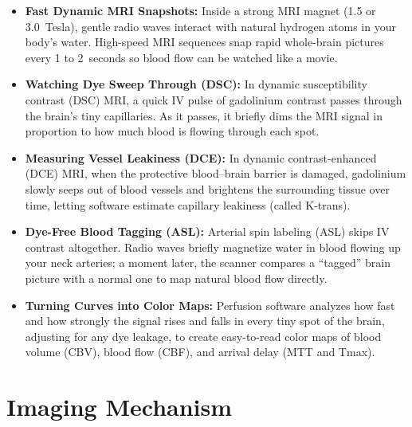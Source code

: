 \begin{itemize}
    \item \textbf{Fast Dynamic MRI Snapshots:} Inside a strong MRI magnet (1.5 or 3.0~Tesla), gentle radio waves interact with natural hydrogen atoms in your body's water. High-speed MRI sequences snap rapid whole-brain pictures every 1 to 2~seconds so blood flow can be watched like a movie.
    \item \textbf{Watching Dye Sweep Through (DSC):} In dynamic susceptibility contrast (DSC) MRI, a quick IV pulse of gadolinium contrast passes through the brain's tiny capillaries. As it passes, it briefly dims the MRI signal in proportion to how much blood is flowing through each spot.
    \item \textbf{Measuring Vessel Leakiness (DCE):} In dynamic contrast-enhanced (DCE) MRI, when the protective blood--brain barrier is damaged, gadolinium slowly seeps out of blood vessels and brightens the surrounding tissue over time, letting software estimate capillary leakiness (called K-trans).
    \item \textbf{Dye-Free Blood Tagging (ASL):} Arterial spin labeling (ASL) skips IV contrast altogether. Radio waves briefly magnetize water in blood flowing up your neck arteries; a moment later, the scanner compares a ``tagged'' brain picture with a normal one to map natural blood flow directly.
    \item \textbf{Turning Curves into Color Maps:} Perfusion software analyzes how fast and how strongly the signal rises and falls in every tiny spot of the brain, adjusting for any dye leakage, to create easy-to-read color maps of blood volume (CBV), blood flow (CBF), and arrival delay (MTT and Tmax).
\end{itemize}

\section{Imaging Mechanism}

